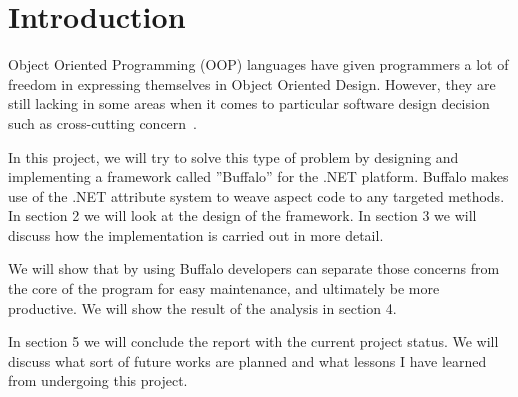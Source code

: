 \chapter{Introduction}


Object Oriented Programming (OOP) languages have given programmers a lot of freedom in expressing themselves in Object Oriented Design. However, they are still lacking in some areas when it comes to particular software design decision such as cross-cutting concern~\cite{aop}.

In this project, we will try to solve this type of problem by designing and implementing a framework called ”Buffalo” for the .NET platform. Buffalo makes use of the .NET attribute system to weave aspect code to any targeted methods. In section 2 we will look at the design of the framework. In section 3 we will discuss how the implementation is carried out in more detail.

We will show that by using Buffalo developers can separate those concerns from the core of the program for easy maintenance, and ultimately be more productive. We will show the result of the analysis in section 4.

In section 5 we will conclude the report with the current project status. We will discuss what sort of future works are planned and what lessons I have learned from undergoing this project.
